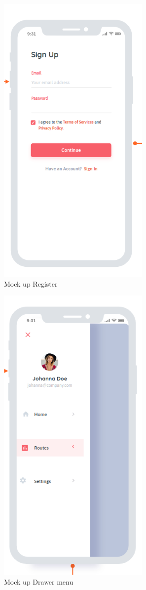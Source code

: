     \begin{figure}[H]
        \includegraphics[width=20em]{./graphics/register_Mockup.png}
        \centering
        \caption{Mock up Register}
        \label{fig:registerMockup}
    \end{figure}
    
    \begin{figure}[H]
        \includegraphics[width=20em]{./graphics/drawer_Mockup.png}
        \centering
        \caption{Mock up Drawer menu}
        \label{fig:DrawerMockup}
    \end{figure}

